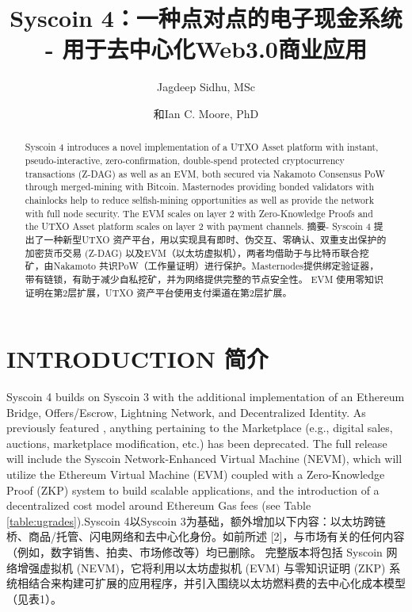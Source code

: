 \documentclass{ctexart}
\title{\centering Syscoin 4：一种点对点的电子现金系统 - 用于去中心化Web3.0商业应用}
\author[1]{Jagdeep Sidhu, MSc}
\author[2]{和Ian C. Moore, PhD}
\affil[1]{Syscoin核心开发人员, Blockchain Foundry Inc.( 邮箱: jsidhu@blockchainfoundry.co) }
\affil[2]{Syscoin研发人员, 邮箱: imoore@syscoin.org}
\date{}
\begin{document}
\maketitle

\begin{abstract}
Syscoin 4 introduces a novel implementation of a UTXO Asset platform with instant, pseudo-interactive, zero-confirmation, double-spend protected cryptocurrency transactions (Z-DAG) as well as an EVM, both secured via Nakamoto Consensus PoW through merged-mining with Bitcoin. Masternodes providing bonded validators with chainlocks help to reduce selfish-mining opportunities as well as provide the network with full node security. The EVM scales on layer 2 with Zero-Knowledge Proofs and the UTXO Asset platform scales on layer 2 with payment channels. 摘要- Syscoin 4 提出了一种新型UTXO 资产平台，用以实现具有即时、伪交互、零确认、双重支出保护的加密货币交易 (Z-DAG) 以及EVM（以太坊虚拟机），两者均借助于与比特币联合挖矿，由Nakamoto 共识PoW（工作量证明）进行保护。Masternodes提供绑定验证器，带有链锁，有助于减少自私挖矿，并为网络提供完整的节点安全性。 EVM 使用零知识证明在第2层扩展，UTXO 资产平台使用支付渠道在第2层扩展。

\end{abstract}

\section{INTRODUCTION 简介}

Syscoin 4 builds on Syscoin 3 with the additional implementation of an Ethereum Bridge, Offers/Escrow, Lightning Network, and Decentralized Identity. As previously featured \cite{Sida18}, anything pertaining to the Marketplace (e.g., digital sales, auctions, marketplace modification, etc.) has been deprecated. The full release will include the Syscoin Network-Enhanced Virtual Machine (NEVM), which will utilize the Ethereum Virtual Machine (EVM) coupled with a Zero-Knowledge Proof (ZKP) system to build scalable applications, and the introduction of a decentralized cost model around Ethereum Gas fees (see Table \ref{table:ugrades}).Syscoin 4以Syscoin 3为基础，额外增加以下内容：以太坊跨链桥、商品/托管、闪电网络和去中心化身份。如前所述 [2]，与市场有关的任何内容（例如，数字销售、拍卖、市场修改等）均已删除。 完整版本将包括 Syscoin 网络增强虚拟机 (NEVM)，它将利用以太坊虚拟机 (EVM) 与零知识证明 (ZKP) 系统相结合来构建可扩展的应用程序，并引入围绕以太坊燃料费的去中心化成本模型 （见表1）。
\end{document}
